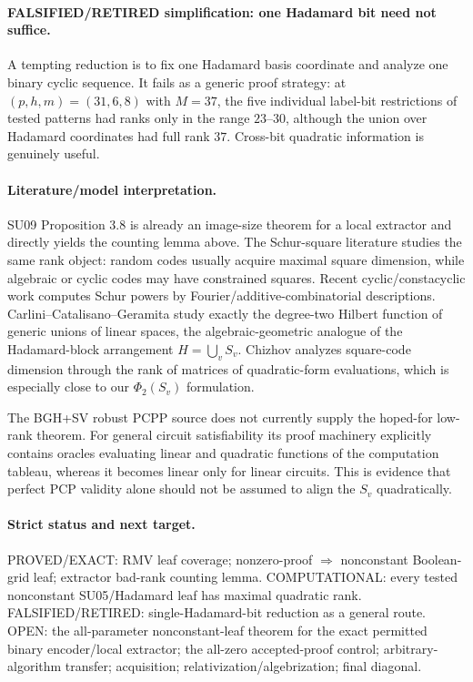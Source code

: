 \documentclass[11pt]{article}
\begin{document}
\paragraph{FALSIFIED/RETIRED simplification: one Hadamard bit need not suffice.}
A tempting reduction is to fix one Hadamard basis coordinate and analyze one binary cyclic sequence. It fails as a generic proof strategy: at $(p,h,m)=(31,6,8)$ with $M=37$, the five individual label-bit restrictions of tested patterns had ranks only in the range $23$--$30$, although the union over Hadamard coordinates had full rank $37$. Cross-bit quadratic information is genuinely useful.

\paragraph{Literature/model interpretation.}
SU09 Proposition 3.8 is already an image-size theorem for a local extractor and directly yields the counting lemma above. The Schur-square literature studies the same rank object: random codes usually acquire maximal square dimension, while algebraic or cyclic codes may have constrained squares. Recent cyclic/constacyclic work computes Schur powers by Fourier/additive-combinatorial descriptions. Carlini--Catalisano--Geramita study exactly the degree-two Hilbert function of generic unions of linear spaces, the algebraic-geometric analogue of the Hadamard-block arrangement $H=\bigcup_v S_v$. Chizhov analyzes square-code dimension through the rank of matrices of quadratic-form evaluations, which is especially close to our $\Phi_2(S_v)$ formulation.

The BGH+SV robust PCPP source does not currently supply the hoped-for low-rank theorem. For general circuit satisfiability its proof machinery explicitly contains oracles evaluating linear and quadratic functions of the computation tableau, whereas it becomes linear only for linear circuits. This is evidence that perfect PCP validity alone should not be assumed to align the $S_v$ quadratically.

\paragraph{Strict status and next target.}
PROVED/EXACT: RMV leaf coverage; nonzero-proof $\Rightarrow$ nonconstant Boolean-grid leaf; extractor bad-rank counting lemma. COMPUTATIONAL: every tested nonconstant SU05/Hadamard leaf has maximal quadratic rank. FALSIFIED/RETIRED: single-Hadamard-bit reduction as a general route. OPEN: the all-parameter nonconstant-leaf theorem for the exact permitted binary encoder/local extractor; the all-zero accepted-proof control; arbitrary-algorithm transfer; acquisition; relativization/algebrization; final diagonal.
\end{document}
